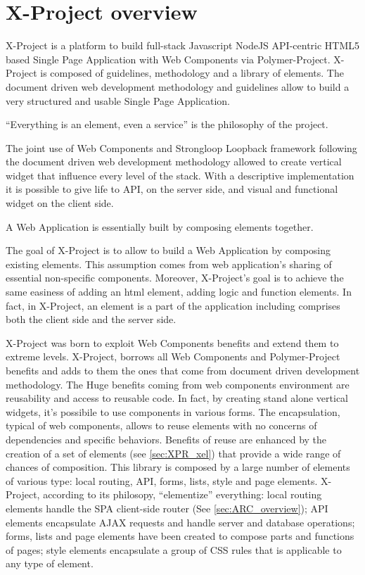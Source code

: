 \section{X-Project overview}
\label{sec:XPR_xpr}

X-Project is a platform to build full-stack Javascript NodeJS API-centric HTML5 based Single Page Application with Web Components via Polymer-Project.
X-Project is composed of guidelines, methodology and a library of elements.
The document driven web development methodology and guidelines allow to build a very structured and usable Single Page Application.

``Everything is an element, even a service'' is the philosophy of the project.

The joint use of Web Components and Strongloop Loopback framework following the document driven web development methodology allowed to create vertical widget that influence every level of the stack. With a descriptive implementation it is possible to give life to API, on the server side, and visual and functional widget on the client side.

A Web Application is essentially built by composing elements together.

The goal of X-Project is to allow to build a Web Application by composing existing elements. This assumption comes from web application's sharing of essential non-specific components.
Moreover, X-Project's goal is to achieve the same easiness of adding an html element, adding logic and function elements.
In fact, in X-Project, an element is a part of the application including comprises both the client side and the server side.

X-Project was born to exploit Web Components benefits and extend them to extreme levels. 
X-Project, borrows all Web Components and Polymer-Project benefits and adds to them the ones that come from document driven development methodology.
The Huge benefits coming from web components environment are reusability and access to reusable code. In fact, by creating stand alone vertical widgets, it's possibile to use components in various forms.
The encapsulation, typical of web components, allows to reuse elements with no concerns of dependencies and specific behaviors.
Benefits of reuse are enhanced by the creation of a set of elements (see \ref{sec:XPR_xel}) that provide a wide range of chances of composition.
This library is composed by a large number of elements of various type: local routing, API, forms, lists, style and page elements. X-Project, according to its philosopy, ``elementize'' everything: local routing elements handle the SPA client-side router (See \ref{sec:ARC_overview}); API elements encapsulate AJAX requests and handle server and database operations; forms, lists and page elements have been created to compose parts and functions of pages; style elements encapsulate a group of CSS rules that is applicable to any type of element.


